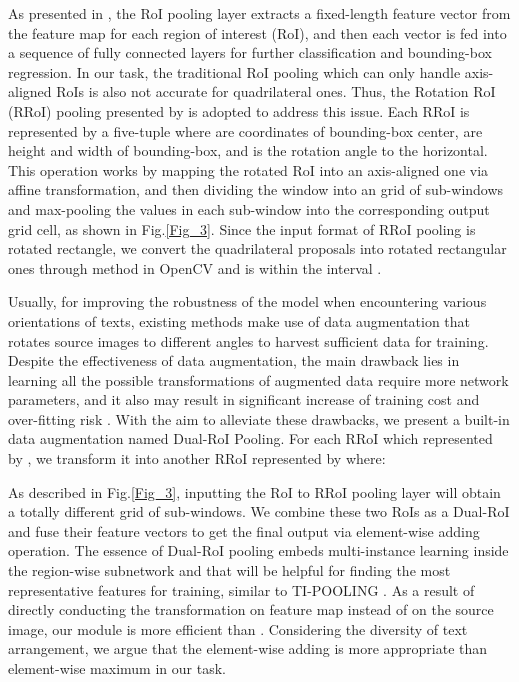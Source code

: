 \documentclass[3p, times]{elsarticle}
\begin{document}
As presented in \cite{FASTRCNN2015ICCV}, the RoI pooling layer extracts a fixed-length feature vector from the feature map for each region of interest (RoI), and then each vector is fed into a sequence of fully connected layers for further classification and bounding-box regression. In our task, the traditional RoI pooling which can only handle axis-aligned RoIs is also not accurate for quadrilateral ones. Thus, the Rotation RoI (RRoI) pooling presented by \cite{RRPN2017ARXIV} is adopted to address this issue. Each RRoI is represented by a five-tuple  where  are coordinates of bounding-box center,  are height and width of bounding-box, and  is the rotation angle to the horizontal. This operation works by mapping the rotated RoI into an axis-aligned one via affine transformation, and then dividing the  window into an  grid of sub-windows and max-pooling the values in each sub-window into the corresponding output grid cell, as shown in Fig.\ref{Fig_3}. Since the input format of RRoI pooling is rotated rectangle, we convert the quadrilateral proposals into rotated rectangular ones through method  in OpenCV and  is within the interval .

Usually, for improving the robustness of the model when encountering various orientations of texts, existing methods \cite{DDR2017ICCV, FTSN2017ARXIV, RRCNN2017ARXIV} make use of data augmentation that rotates source images to different angles to harvest sufficient data for training. Despite the effectiveness of data augmentation, the main drawback lies in learning all the possible transformations of augmented data require more network parameters, and it also may result in significant increase of training cost and over-fitting risk \cite{ORN2017CVPR}. With the aim to alleviate these drawbacks, we present a built-in data augmentation named Dual-RoI Pooling. For each RRoI  which represented by , we transform it into another RRoI  represented by  where:



\noindent As described in Fig.\ref{Fig_3}, inputting the RoI  to RRoI pooling layer will obtain a totally different grid of sub-windows. We combine these two RoIs as a Dual-RoI and fuse their feature vectors to get the final output via element-wise adding operation. The essence of Dual-RoI pooling embeds multi-instance learning \cite{DML2015CVPR} inside the region-wise subnetwork and that will be helpful for finding the most representative features for training, similar to TI-POOLING \cite{TIPOOL2016CVPR}. As a result of directly conducting the transformation on feature map instead of on the source image, our module is more efficient than \cite{TIPOOL2016CVPR}. Considering the diversity of text arrangement, we argue that the element-wise adding is more appropriate than element-wise maximum in our task. 
\end{document}
